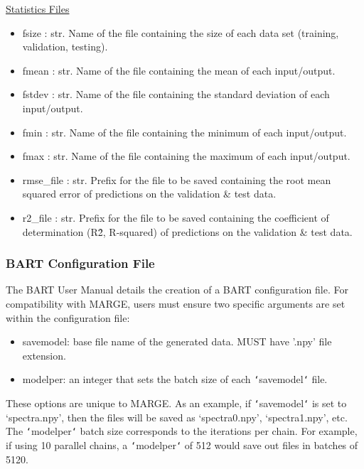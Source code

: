 \documentclass[letterpaper, 12pt]{article}
\begin{document}
\noindent \underline{Statistics Files}
\begin{itemize}
\item fsize      : str.  Name of the file containing the size of each data set
                         (training, validation, testing).
\item fmean      : str.  Name of the file containing the mean of each input/output.
\item fstdev     : str.  Name of the file containing the standard deviation of each 
                   input/output.
\item fmin       : str.  Name of the file containing the minimum of each input/output.
\item fmax       : str.  Name of the file containing the maximum of each input/output.
\item rmse\_file  : str.  Prefix for the file to be saved containing the root mean 
                   squared error of predictions on the validation \& test data.
\item r2\_file    : str.  Prefix for the file to be saved containing the coefficient of
                   determination (R\^2, R-squared) of predictions on the 
                   validation \& test data.
\end{itemize}



\subsubsection{BART Configuration File}
\label{sec:BARTconfig}

The BART User Manual details the creation of a BART configuration file.  For 
compatibility with MARGE, users must ensure two specific arguments are set 
within the configuration file:
\begin{itemize}
\item savemodel: base file name of the generated data. MUST have '.npy' file 
                 extension.
\item modelper: an integer that sets the batch size of each 
                \texttt{`}savemodel\texttt{`} file.
\end{itemize}

\noindent These options are unique to MARGE.  As an example, if 
\texttt{`}savemodel\texttt{`} is set to `spectra.npy', then the files will be 
saved as `spectra0.npy', `spectra1.npy', etc.  The \texttt{`}modelper\texttt{`} 
batch size corresponds to the iterations per chain.  For example, if using 10 
parallel chains, a \texttt{`}modelper\texttt{`} of 512 would save out files in 
batches of 5120.\newline
\end{document}
